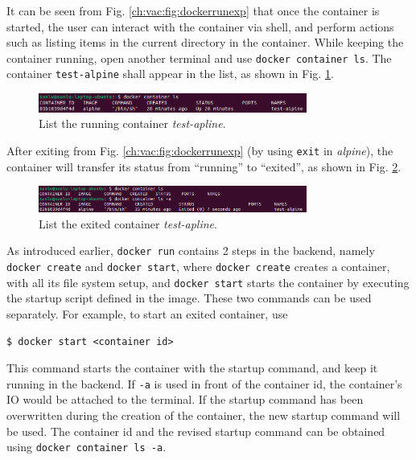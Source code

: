 It can be seen from Fig. \ref{ch:vac:fig:dockerrunexp} that once the container is started, the user can interact with the container via shell, and perform actions such as listing items in the current directory in the container. While keeping the container running, open another terminal and use \verb|docker container ls|. The container \verb|test-alpine| shall appear in the list, as shown in Fig. \ref{ch:vac:fig:dockerrunexppart2}.
\begin{figure}[htbp]
	\centering
	\includegraphics[width=250pt]{chapters/ch-virtualization-and-containerization/figures/dockerrunexppart2.png}
	\caption{List the running container \textit{test-apline}.} \label{ch:vac:fig:dockerrunexppart2}
\end{figure}
After exiting from Fig. \ref{ch:vac:fig:dockerrunexp} (by using \verb|exit| in \textit{alpine}), the container will transfer its status from ``running'' to ``exited'', as shown in Fig. \ref{ch:vac:fig:dockerrunexppart3}.
\begin{figure}[htbp]
	\centering
	\includegraphics[width=250pt]{chapters/ch-virtualization-and-containerization/figures/dockerrunexppart3.png}
	\caption{List the exited container \textit{test-apline}.} \label{ch:vac:fig:dockerrunexppart3}
\end{figure}

As introduced earlier, \verb|docker run| contains 2 steps in the backend, namely \verb|docker create| and \verb|docker start|, where \verb|docker create| creates a container, with all its file system setup, and \verb|docker start| starts the container by executing the startup script defined in the image. These two commands can be used separately. For example, to start an exited container, use
\begin{lstlisting}
$ docker start <container id>
\end{lstlisting}
This command starts the container with the startup command, and keep it running in the backend. If \verb|-a| is used in front of the container id, the container's IO would be attached to the terminal. If the startup command has been overwritten during the creation of the container, the new startup command will be used. The container id and the revised startup command can be obtained using \verb|docker container ls -a|.

